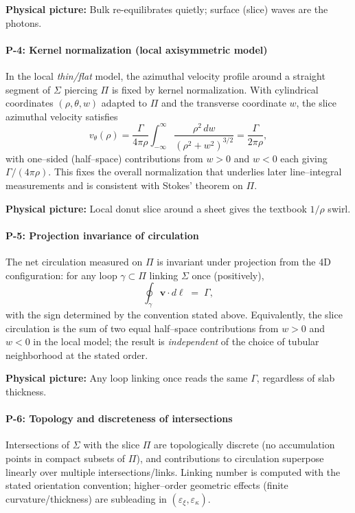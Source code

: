\begin{physbox}\textbf{Physical picture:} Bulk re-equilibrates quietly; surface (slice) waves are the photons.\end{physbox}

\paragraph{P-4: Kernel normalization (local axisymmetric model)}
\label{post:P4}
In the local \emph{thin/flat} model, the azimuthal velocity profile around a straight segment of $\Sigma$ piercing $\Pi$ is fixed by kernel normalization. With cylindrical coordinates $(\rho,\theta,w)$ adapted to $\Pi$ and the transverse coordinate $w$, the slice azimuthal velocity satisfies
\[
v_\theta(\rho)
=\frac{\Gamma}{4\pi\rho}\!\int_{-\infty}^{\infty}\frac{\rho^2\,dw}{(\rho^2+w^2)^{3/2}}
=\frac{\Gamma}{2\pi\rho},
\]
with one–sided (half–space) contributions from $w>0$ and $w<0$ each giving $\Gamma/(4\pi\rho)$. This fixes the overall normalization that underlies later line–integral measurements and is consistent with Stokes' theorem on $\Pi$.

\begin{physbox}\textbf{Physical picture:} Local donut slice around a sheet gives the textbook $1/\rho$ swirl.\end{physbox}

\paragraph{P-5: Projection invariance of circulation}
\label{post:P5}
The net circulation measured on $\Pi$ is invariant under projection from the 4D configuration: for any loop $\gamma\subset\Pi$ linking $\Sigma$ once (positively),
\[
\oint_{\gamma}\mathbf{v}\cdot d\boldsymbol{\ell}\;=\;\Gamma,
\]
with the sign determined by the convention stated above. Equivalently, the slice circulation is the sum of two equal half–space contributions from $w>0$ and $w<0$ in the local model; the result is \emph{independent} of the choice of tubular neighborhood at the stated order.

\begin{physbox}\textbf{Physical picture:} Any loop linking once reads the same $\Gamma$, regardless of slab thickness.\end{physbox}

\paragraph{P-6: Topology and discreteness of intersections}
\label{post:P6}
Intersections of $\Sigma$ with the slice $\Pi$ are topologically discrete (no accumulation points in compact subsets of $\Pi$), and contributions to circulation superpose linearly over multiple intersections/links. Linking number is computed with the stated orientation convention; higher–order geometric effects (finite curvature/thickness) are subleading in $(\varepsilon_\xi,\varepsilon_\kappa)$.


